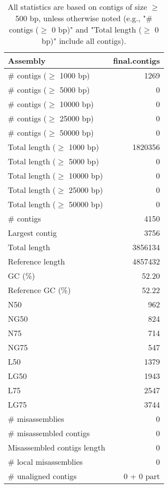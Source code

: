 \documentclass[12pt,a4paper]{article}
\begin{document}
\begin{table}[ht]
\begin{center}
\caption{All statistics are based on contigs of size $\geq$ 500 bp, unless otherwise noted (e.g., "\# contigs ($\geq$ 0 bp)" and "Total length ($\geq$ 0 bp)" include all contigs).}
\begin{tabular}{|l*{1}{|r}|}
\hline
Assembly & final.contigs \\ \hline
\# contigs ($\geq$ 1000 bp) & 1269 \\ \hline
\# contigs ($\geq$ 5000 bp) & 0 \\ \hline
\# contigs ($\geq$ 10000 bp) & 0 \\ \hline
\# contigs ($\geq$ 25000 bp) & 0 \\ \hline
\# contigs ($\geq$ 50000 bp) & 0 \\ \hline
Total length ($\geq$ 1000 bp) & 1820356 \\ \hline
Total length ($\geq$ 5000 bp) & 0 \\ \hline
Total length ($\geq$ 10000 bp) & 0 \\ \hline
Total length ($\geq$ 25000 bp) & 0 \\ \hline
Total length ($\geq$ 50000 bp) & 0 \\ \hline
\# contigs & 4150 \\ \hline
Largest contig & 3756 \\ \hline
Total length & 3856134 \\ \hline
Reference length & 4857432 \\ \hline
GC (\%) & 52.20 \\ \hline
Reference GC (\%) & 52.22 \\ \hline
N50 & 962 \\ \hline
NG50 & 824 \\ \hline
N75 & 714 \\ \hline
NG75 & 547 \\ \hline
L50 & 1379 \\ \hline
LG50 & 1943 \\ \hline
L75 & 2547 \\ \hline
LG75 & 3744 \\ \hline
\# misassemblies & 0 \\ \hline
\# misassembled contigs & 0 \\ \hline
Misassembled contigs length & 0 \\ \hline
\# local misassemblies & 0 \\ \hline
\# unaligned contigs & 0 + 0 part \\ \hline

\end{tabular}
\end{center}
\end{table}
\end{document}
